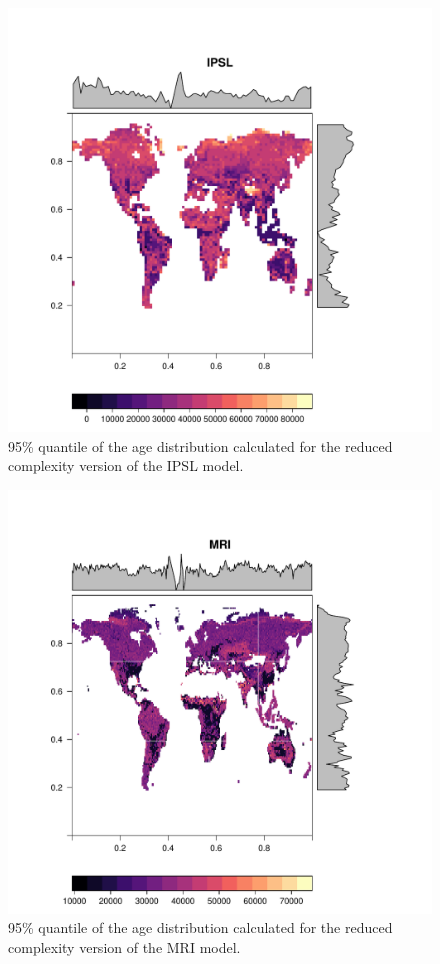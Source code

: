 \documentclass{agujournal}
\begin{document}
\begin{figure}[t]
   \centering
   \includegraphics{Figures/corrP95IPSL} %
   \caption{95\% quantile of the age distribution calculated for the reduced complexity version of the IPSL model.}
\end{figure}

\begin{figure}[t]
   \centering
   \includegraphics{Figures/corrP95MRI} %
   \caption{95\% quantile of the age distribution calculated for the reduced complexity version of the MRI model.}
\end{figure}
\end{document}
